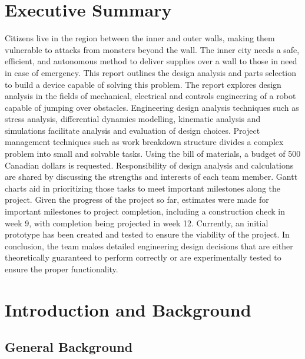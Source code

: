 \documentclass[ece]{uw-wkrpt}
\let\oldsection\section
\renewcommand\section{\clearpage\oldsection}
\begin{document}
\section{Executive Summary}\label{sec:summary}
Citizens live in the region between the inner and outer walls, making them vulnerable to attacks from monsters beyond the wall. The inner city needs a safe, efficient, and autonomous method to deliver supplies over a wall to those in need in case of emergency. This report outlines the design analysis and parts selection to build a device capable of solving this problem. The report explores design analysis in the fields of mechanical, electrical and controls engineering of a robot capable of jumping over obstacles. Engineering design analysis techniques such as stress analysis, differential dynamics modelling, kinematic analysis and simulations facilitate analysis and evaluation of design choices. Project management techniques such as work breakdown structure divides a complex problem into small and solvable tasks. Using the bill of materials, a budget of 500 Canadian dollars is requested. Responsibility of design analysis and calculations are shared by discussing the strengths and interests of each team member. Gantt charts aid in prioritizing those tasks to meet important milestones along the project. Given the progress of the project so far, estimates were made for important milestones to project completion, including a construction check in week 9, with completion being projected in week 12. Currently, an initial prototype has been created and tested to ensure the viability of the project. In conclusion, the team makes detailed engineering design decisions that are either theoretically guaranteed to perform correctly or are experimentally tested to ensure the proper functionality.

\tableofcontents
\listoffigures
\listoftables



\mainmatter

\section{Introduction and Background}

\subsection{General Background}
\end{document}
